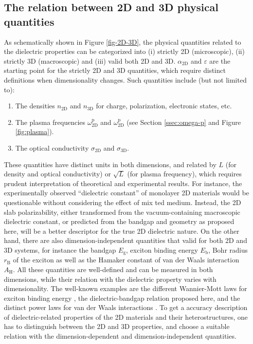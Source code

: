 \documentclass[manuscript=suppinfo,email=true,hyperref=true,keywords=false]{achemso}
\begin{document}
\subsection{The relation between 2D and 3D physical quantities}
As schematically shown in Figure \ref{fig-2D-3D}, the physical
quantities related to the dielectric properties can be categorized
into (i) strictly 2D (microscopic), (ii) strictly 3D (macroscopic) and
(iii) valid both 2D and 3D.  $\alpha_{\mathrm{2D}}$ and $\varepsilon$ are the
starting point for the strictly 2D and 3D quantities, which require
distinct definitions when dimensionality changes. Such quantities
include (but not limited to):
\begin{enumerate}
\item The densities $n_{\mathrm{2D}}$ and $n_{\mathrm{3D}}$ for
  charge, polarization, electronic states, etc.
  
\item The plasma frequencies $\omega^{\mathrm{p}}_{\mathrm{2D}}$ and
  $\omega^{\mathrm{p}}_{\mathrm{2D}}$\cite{Nazarov_2015_2D_3D} (see
  Section \ref{ssec:omega-p} and Figure \ref{fig:plasma}).

\item The optical conductivity $\sigma_{\mathrm{2D}}$ and
  $\sigma_{\mathrm{3D}}$\cite{Bechstedt_2012,Matthes_2016}.
\end{enumerate}
These quantities have distinct units in both dimensions, and related
by $L$ (for density and optical conductivity) or $\sqrt{L}$ (for
plasma frequency), which requires prudent interpretation of
theoretical and experimental results. For instance, the experimentally
observed ``dielectric constant'' of monolayer 2D materials
\cite{Ning_2015,Li_2014,Yao_2014,Wu_2015} would be questionable
without considering the effect of mix ted medium. Instead, the 2D slab
polarizability, either transformed from the vacuum-containing
macroscopic dielectric constant, or predicted from the bandgap and
geometry as proposed here, will be a better descriptor for the true 2D
dielectric nature. On the other hand, there are also
dimension-independent quantities that valid for both 2D and 3D
systems, for instance the bandgap $E_{\mathrm{g}}$, exciton binding
energy $E_{\mathrm{b}}$, Bohr radius $r_{\mathrm{B}}$ of the exciton
as well as the Hamaker constant of van der Waals interaction
$A_{\mathrm{H}}$. All these quantities are well-defined and can be
measured in both dimensions, while their relation with the dielectric
property varies with dimensionality. The well-known examples are the
different Wannier-Mott laws for exciton binding energy
\cite{Olsen_2016_hydrogen}, the dielectric-bandgap relation
proposed here, and the distinct power laws for van der Waals
interactions \cite{Gobre_2013}. To get a accuracy description of
dielectric-related properties of the 2D materials and their
heterostructures, one has to distinguish between the 2D and 3D
properties, and choose a suitable relation with the
dimension-dependent and dimension-independent quantities.
\end{document}
